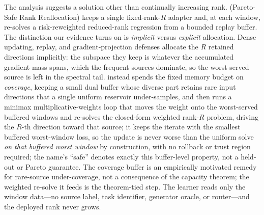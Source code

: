 The analysis suggests a solution other than continually increasing rank.
\method{} (Pareto-Safe Rank Reallocation) keeps a single fixed-rank-$R$ adapter
and, at each window, re-solves a risk-reweighted reduced-rank regression from a
bounded replay buffer. The distinction our evidence turns on is
\emph{implicit} versus \emph{explicit} allocation. Dense updating, replay, and
gradient-projection defenses allocate the $R$ retained directions implicitly:
the subspace they keep is whatever the accumulated gradient mass spans, which the
frequent sources dominate, so the worst-served source is left in the spectral
tail. \method{} instead spends the fixed memory budget on \emph{coverage}, keeping a
small dual buffer whose diverse part retains rare input directions that a single
uniform reservoir under-samples, and then runs a minimax multiplicative-weights
loop that moves the weight onto the worst-served buffered windows and re-solves
the closed-form weighted rank-$R$ problem, driving the $R$-th direction toward
that source; it keeps the iterate with the smallest buffered worst-window loss,
so the update is never worse than the uniform solve \emph{on that buffered
worst window} by construction, with no rollback or trust region required; the
name's ``safe'' denotes exactly this buffer-level property, not a held-out or
Pareto guarantee. The coverage buffer is an empirically
motivated remedy for rare-source under-coverage, not a consequence of the
capacity theorem; the weighted re-solve it feeds is the theorem-tied step. The
learner reads only the window data---no source label, task identifier, generator
oracle, or router---and the deployed rank never grows.

